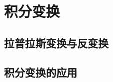 \chapter{积分变换}



\section{拉普拉斯变换与反变换}
\label{sec:laplace_transform_and_inverse_transform}



\section{积分变换的应用}
\label{sec:integral_transform_applications}
